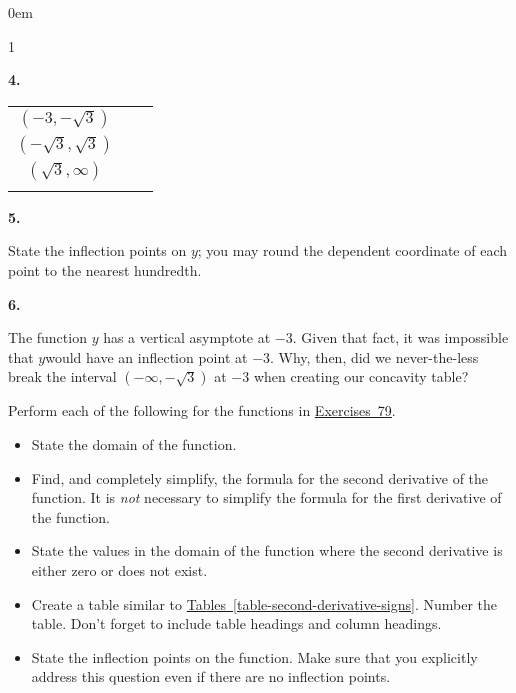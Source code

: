 \documentclass[12pt,]{book}
\theoremstyle{plain}
\theoremstyle{definition}
\numberwithin{equation}{section}
\newcommand{\hrulethin}  {\noalign{\hrule height 0.04em}}
\newcommand{\hrulethick} {\noalign{\hrule height 0.11em}}
\newenvironment{exercisegroup}%
{\medskip\noindent}%
{\par\bigskip}%
\newlength{\exercisegroupindent}%
\newlength{\exercisegroupitemwidth}%
\newenvironment{exercisegrouplist}%
{\vspace{-\partopsep}%
\begin{adjustwidth}{\exercisegroupindent}{0em}}%
{\end{adjustwidth}%
\vspace{-\partopsep}%
\vspace{\baselineskip}}%
\newenvironment{exercisegroupbycol}[1]%
{\begin{exercisegrouplist}%
\vspace{-\multicolsep}%
\begin{multicols}{#1}%
\setlength{\parindent}{0em}%
\setlength{\exercisegroupitemwidth}{\linewidth}}%
{\end{multicols}%
\vspace{-\multicolsep}%
\end{exercisegrouplist}}%
\newenvironment{exercisegroupitem}[1]%
{\begin{minipage}[t]{\exercisegroupitemwidth}
\vspace{0pt}%
{\bfseries#1}%
\rule{0pt}{\baselineskip}}{\strut%
\end{minipage}%
\hspace{\columnsep}}%
\providecommand\phantomsection{}
\newcommand{\ointerval}[2]{\left(#1,#2\right)}
\begin{document}
\begin{exerciselist}
\begin{exercisegroup}
\begin{exercisegroupbycol}{1}
\begin{exercisegroupitem}{4. }
\begin{table}
\begin{tabular}{ccc}
\(\ointerval{-3}{-\sqrt{3}}\)&&\\\hrulethin
\(\ointerval{-\sqrt{3}}{\sqrt{3}}\)&&\\\hrulethin
\(\ointerval{\sqrt{3}}{\infty}\)&&\\\hrulethick
\end{tabular}
\end{table}
\end{exercisegroupitem}%
\par%
\begin{exercisegroupitem}{5. }\phantomsection\hypertarget{exercise-41}{\null}
State the inflection points on \(y\); you may round the dependent coordinate of each point to the nearest hundredth.%
\end{exercisegroupitem}%
\par%
\begin{exercisegroupitem}{6. }\phantomsection\hypertarget{exercise-42}{\null}
The function \(y\) has a vertical asymptote at \(-3\).  Given that fact, it was impossible that \(y\)would have an inflection point at \(-3\).  Why, then, did we never-the-less break the interval \(\ointerval{-\infty}{-\sqrt{3}}\) at \(-3\) when creating our concavity table?%
\end{exercisegroupitem}%
\par%
\end{exercisegroupbycol}%
\end{exercisegroup}%
\begin{exercisegroup}%
Perform each of the following for the functions in \hyperref[exercise-make-second-derivative-table-first]{Exercises~7}\textendash{}\hyperref[exercise-make-second-derivative-table-last]{9}.%
\begin{itemize}[label=\textbullet]
\item{}State the domain of the function.\item{}Find, and completely simplify, the formula for the second derivative of the function. It is \emph{not} necessary to simplify the formula for the first derivative of the function.\item{}State the values in the domain of the function where the second derivative is either zero or does not exist.\item{}Create a table similar to \hyperref[table-second-derivative-signs]{Tables~\ref*{table-second-derivative-signs}}.  Number the table.  Don't forget to include table headings and column headings.\item{}State the inflection points on the function.  Make sure that you explicitly address this question even if there are no inflection points.\end{itemize}

\end{exercisegroup}
\end{exerciselist}
\end{document}

